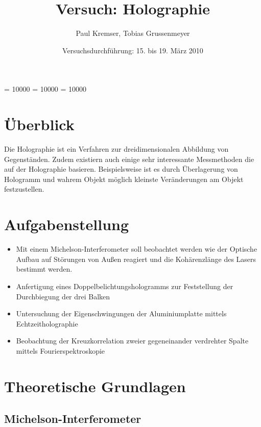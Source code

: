 \documentclass[12pt]{article}
\newcommand{\changefont}[3]{
\fontfamily{#1} \fontseries{#2} \fontshape{#3} \selectfont}
\begin{document}
\clubpenalty = 10000
\widowpenalty = 10000 
\displaywidowpenalty = 10000

\onehalfspacing
\changefont{ptm}{m}{n} 

\begin{titlepage}
\author{Paul Kremser, Tobias Grussenmeyer}
\title{Versuch: Holographie}
\date{Versuchsdurchführung: 15. bis 19. März 2010} 
\maketitle
\thispagestyle{empty}
\end{titlepage}


\tableofcontents
\thispagestyle{empty}
\newpage
{}
\section{Überblick}
Die Holographie ist ein Verfahren zur dreidimensionalen Abbildung von
Gegenständen. Zudem existiern auch einige sehr interessante Messmethoden die auf der Holographie basieren. Beispielsweise ist es durch Überlagerung von 
Hologramm und wahrem Objekt möglich kleinste Veränderungen am Objekt festzustellen. 

\section{Aufgabenstellung}
\begin{itemize}
 \item Mit einem Michelson-Interferometer soll beobachtet werden wie der Optische Aufbau auf Störungen von Außen reagiert und die Kohärenzlänge des Lasers 
      bestimmt werden.
 \item Anfertigung eines Doppelbelichtungshologramms zur Feststellung der Durchbiegung der drei Balken
 \item Untersuchung der Eigenschwingungen der Aluminiumplatte mittels Echtzeitholographie
 \item Beobachtung der Kreuzkorrelation zweier gegeneinander verdrehter Spalte mittels Fourierspektroskopie
\end{itemize}


\section{Theoretische Grundlagen}
\subsection{Michelson-Interferometer}
\end{document}
